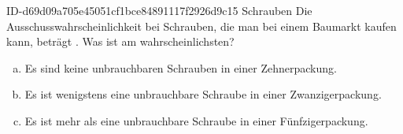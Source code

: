 \begin{exercise}
      {ID-d69d09a705e45051cf1bce84891117f2926d9c15}
      {Schrauben}
  \ifproblem\problem
    Die Ausschusswahrscheinlichkeit bei Schrauben, die man bei einem Baumarkt
    kaufen kann, beträgt . Was ist am wahrscheinlichsten?
    \begin{enumerate}[a)]
      \item Es sind keine unbrauchbaren Schrauben in einer Zehnerpackung.
      \item Es ist wenigstens eine unbrauchbare Schraube in einer Zwanzigerpackung.
      \item Es ist mehr als eine unbrauchbare Schraube in einer Fünfzigerpackung.
    \end{enumerate}
  \fi
\end{exercise}

